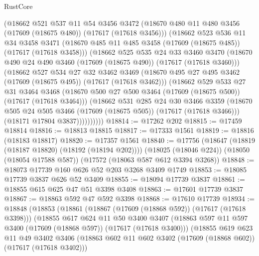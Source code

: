 \begin{lexlean}{RustCore}
\begin{coremodule}
          (@18662
            @521
            @537
            @11
            @54
            @3456
            @3472
            (@18670 @480 @11 @480 @3456 (@17609 (@18675 @480)) (@17617 (@17618 @3456)))
            (@18662
              @523
              @536
              @11
              @34
              @3458
              @3471
              (@18670 @485 @11 @485 @3458 (@17609 (@18675 @485)) (@17617 (@17618 @3458)))
              (@18662
                @525
                @535
                @24
                @33
                @3460
                @3470
                (@18670 @490 @24 @490 @3460 (@17609 (@18675 @490)) (@17617 (@17618 @3460)))
                (@18662
                  @527
                  @534
                  @27
                  @32
                  @3462
                  @3469
                  (@18670 @495 @27 @495 @3462 (@17609 (@18675 @495)) (@17617 (@17618 @3462)))
                  (@18662
                    @529
                    @533
                    @27
                    @31
                    @3464
                    @3468
                    (@18670 @500 @27 @500 @3464 (@17609 (@18675 @500)) (@17617 (@17618 @3464)))
                    (@18662
                      @531
                      @285
                      @24
                      @30
                      @3466
                      @3359
                      (@18670 @505 @24 @505 @3466 (@17609 (@18675 @505)) (@17617 (@17618 @3466)))
                      (@18171 @17804 @3837))))))))))
@18814 := @17262 @202
@18815 := @17459 @18814
@18816 := @18813 @18815
@18817 := @17333 @1561
@18819 := @18816 (@18183 @18817)
@18820 := @17357 @1561
@18840 := @17756
    (@18647 (@18819 (@18187 @18820) (@18192 (@18194 @202))))
    (@18025 (@18046 @224))
    (@18050 (@18054 @17588 @587))
    (@17572 (@18063 @587 @612 @3394 @3268))
@18848 := @18073 @17739 @160 @626 @52 @203 @3268 @3409 @1749
@18853 := @18085 @17739 @3837 @626 @52 @3409
@18855 := @18094 @17739 @3837
@18861 := @18855 @615 @625 @47 @51 @3398 @3408
@18863 := @17601 @17739 @3837
@18867 := @18863 @592 @47 @592 @3398
@18868 := @17610 @17739
@18934 := @18848
    (@18853
      (@18861
        (@18867 (@17609 (@18868 @592)) (@17617 (@17618 @3398)))
        (@18855
          @617
          @624
          @11
          @50
          @3400
          @3407
          (@18863 @597 @11 @597 @3400 (@17609 (@18868 @597)) (@17617 (@17618 @3400)))
          (@18855
            @619
            @623
            @11
            @49
            @3402
            @3406
            (@18863 @602 @11 @602 @3402 (@17609 (@18868 @602)) (@17617 (@17618 @3402)))

\end{coremodule}
\end{lexlean}
